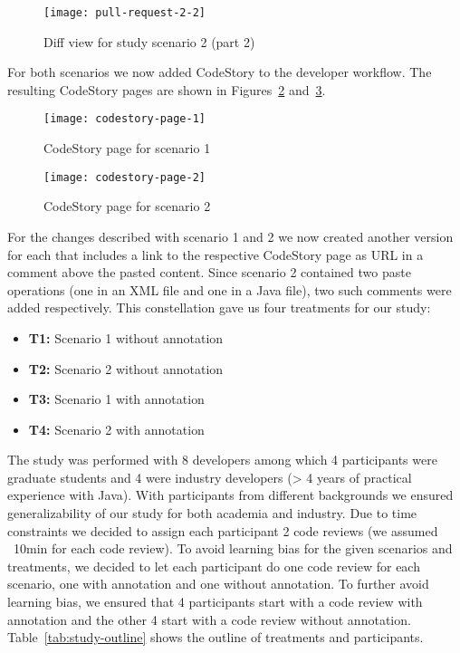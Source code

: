 \documentclass[../manifest.tex]{subfiles}
\begin{document}
\begin{figure}[h]
  \label{fig:pull-request-2-2}
  \centering
  \texttt{[image: pull-request-2-2]}
  \caption{Diff view for study scenario 2 (part 2)}
\end{figure}

For both scenarios we now added CodeStory to the developer workflow. The resulting CodeStory pages are shown in Figures~\ref{fig:codestory-page-1} and~\ref{fig:codestory-page-2}.

\begin{figure}[h]
  \label{fig:codestory-page-1}
  \centering
  \texttt{[image: codestory-page-1]}
  \caption{CodeStory page for scenario 1}
\end{figure}

\begin{figure}[h]
  \label{fig:codestory-page-2}
  \centering
  \texttt{[image: codestory-page-2]}
  \caption{CodeStory page for scenario 2}
\end{figure}

For the changes described with scenario 1 and 2 we now created another version for each that includes a link to the respective CodeStory page as URL in a comment above the pasted content. Since scenario 2 contained two paste operations (one in an XML file and one in a Java file), two such comments were added respectively. This constellation gave us four treatments for our study:
\begin{itemize}
  \item \textbf{T1:} Scenario 1 without annotation
  \item \textbf{T2:} Scenario 2 without annotation
  \item \textbf{T3:} Scenario 1 with annotation
  \item \textbf{T4:} Scenario 2 with annotation
\end{itemize}

The study was performed with 8 developers among which 4 participants were graduate students and 4 were industry developers (> 4 years of practical experience with Java). With participants from different backgrounds we ensured generalizability of our study for both academia and industry. Due to time constraints we decided to assign each participant 2 code reviews (we assumed ~10min for each code review). To avoid learning bias for the given scenarios and treatments, we decided to let each participant do one code review for each scenario, one with annotation and one without annotation. To further avoid learning bias, we ensured that 4 participants start with a code review with annotation and the other 4 start with a code review without annotation. Table~\ref{tab:study-outline} shows the outline of treatments and participants.
\end{document}
